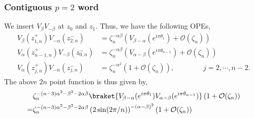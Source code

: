 \documentclass[11pt]{article}
\newcommand{\mO}{\mathcal{O}}
\newcommand{\lb}{\left(}
\newcommand{\rb}{\right)}
\begin{document}
\subsubsection{\texorpdfstring{Contiguous $p=2$ word}{Contiguous p=2 word}}

We insert $V_\beta V_{-\beta}$ at $z_0$ and $z_1$. Thus, we have the following OPEs,
\begin{align}
    V_\beta(z_{1,n}^+) V_{-\alpha}(z_{2,n}^-) &= \zeta_n^{-\alpha \beta} \lb V_{\beta-\alpha} (e^{i\pi \theta_{1}})+ \mO(\zeta_n)\rb \\
    V_\alpha(z_{n-1,n}^+) V_{-\beta}(z_{0,n}^-) &= \zeta_n^{-\alpha \beta} \lb V_{\alpha-\beta}(e^{i\pi \theta_{n-1}}) + \mO(\zeta_n)\rb \\
    V_\alpha(z_{j,n}^+) V_{-\alpha}(z_{j,n}^-) &= \zeta_n^{-\alpha ^2} \lb 1 + \mO(\zeta_n)\rb, \qquad \qquad j = 2, \cdots, n-2.
\end{align}
The above $2n$ point function is thus given by,
\begin{align}
    &\zeta_n^{-(n-3)\alpha^2 -\beta^2 -2\alpha\beta} \braket{V_{\beta-\alpha}(e^{i \pi \theta_1})V_{\alpha - \beta}(e^{i \pi \theta_{n-1}})}\lb 1 + \mO(\zeta_n)\rb \\
    =& \zeta_n^{-(n-3)\alpha^2 -\beta^2 -2\alpha\beta} \lb2\sin(2\pi/n)\rb^{-(\alpha - \beta)^2} \lb 1+ \mO(\zeta_n)\rb
\end{align} 
\end{document}
